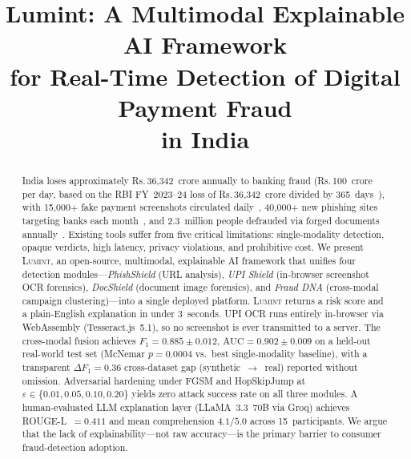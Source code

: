 \documentclass[conference]{IEEEtran}
\def\rupee{\textrm{Rs.\,}}
\begin{document}
\title{Lumint: A Multimodal Explainable AI Framework\\
for Real-Time Detection of Digital Payment Fraud\\
in India}

\author{%
  }

\maketitle

\begin{abstract}
India loses approximately \rupee{}36{,}342~crore annually to banking fraud
(\rupee{}100~crore per day, based on the RBI FY~2023--24 loss of
\rupee{}36{,}342~crore divided by 365~days~\cite{rbi2024}),
with 15{,}000$+$ fake payment screenshots circulated
daily~\cite{certin2024}, 40{,}000$+$ new phishing sites targeting banks
each month~\cite{apwg2024}, and 2.3~million people defrauded via
forged documents annually~\cite{rbi2023framework}.
Existing tools suffer from five critical limitations: single-modality
detection, opaque verdicts, high latency, privacy violations, and
prohibitive cost.
We present \textsc{Lumint}, an open-source, multimodal, explainable AI
framework that unifies four detection modules---\emph{PhishShield}
(URL analysis), \emph{UPI Shield} (in-browser screenshot OCR
forensics), \emph{DocShield} (document image forensics), and
\emph{Fraud DNA} (cross-modal campaign clustering)---into a single
deployed platform.
\textsc{Lumint} returns a risk score and a plain-English explanation in
under 3~seconds.
UPI OCR runs entirely in-browser via WebAssembly (Tesseract.js~5.1),
so no screenshot is ever transmitted to a server.
The cross-modal fusion achieves $F_1{=}0.885{\pm}0.012$,
$\mathrm{AUC}{=}0.902{\pm}0.009$ on a held-out real-world test set
(McNemar $p{=}0.0004$ vs.\ best single-modality baseline),
with a transparent $\Delta F_1{=}0.36$ cross-dataset gap
(synthetic~$\to$~real) reported without omission.
Adversarial hardening under FGSM and HopSkipJump at
$\varepsilon\!\in\!\{0.01,0.05,0.10,0.20\}$ yields zero attack success
rate on all three modules.
A human-evaluated LLM explanation layer (LLaMA~3.3~70B via Groq)
achieves ROUGE-L~$=0.411$ and mean comprehension $4.1/5.0$ across
15~participants.
We argue that the lack of explainability---not raw accuracy---is the
primary barrier to consumer fraud-detection adoption.
\end{abstract}
\end{document}
